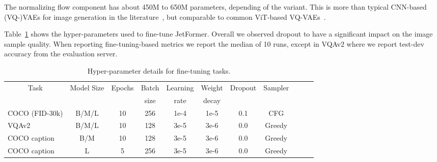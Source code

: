 \documentclass{article} %
\newcommand{\name}{JetFormer\xspace}
\begin{document}
The normalizing flow component has about 450M to 650M parameters, depending of the variant. This is more than typical CNN-based (VQ-)VAEs for image generation in the literature~\citep{esser2020taming, rombach2021high}, but comparable to common ViT-based VQ-VAEs~\citep{yu2021vector, yu2022scaling}.

Table~\ref{tab:hparams_details} shows the hyper-parameters used to fine-tune JetFormer. Overall we observed dropout to have a significant impact on the image sample quality. When reporting fine-tuning-based metrics we report the median of 10 runs, except in VQAv2 where we report test-dev accuracy from the evaluation server.

\begin{table}[h]
    \caption{Architecture details for different \name variants. See Section~\ref{app:architecture} for a discussion.}
    \centering
    
    \label{tab:arch_details}
\end{table}

\begin{table}[h]
    \caption{Hyper-parameter details for fine-tuning tasks.}
    \centering
    \begin{tabular}{ccccccccccc}
    \toprule
     \multirow{2}{*}{Task} & \multirow{2}{*}{Model Size} & \multirow{2}{*}{Epochs} & Batch & Learning & Weight & \multirow{2}{*}{Dropout} & \multirow{2}{*}{Sampler} \\
    &  & & size & rate & decay & &  \\
    \midrule

    \multicolumn{1}{l}{COCO (FID-30k)} & B/M/L & 10 & 256 & 1e-4 & 1e-5 & 0.1 & CFG \\ 

    \multicolumn{1}{l}{VQAv2} & B/M/L & 10 & 128 & 3e-5 & 3e-6 & 0.0 & Greedy \\ 

    \multicolumn{1}{l}{COCO caption} & B/M & 10 & 128 & 3e-5 & 3e-6 & 0.0 & Greedy \\ 
    \multicolumn{1}{l}{COCO caption} & L & 5 & 256 & 3e-5 & 3e-6 & 0.0 & Greedy \\ 


    \bottomrule
    \end{tabular}
    \label{tab:hparams_details}
\end{table}
\end{document}
